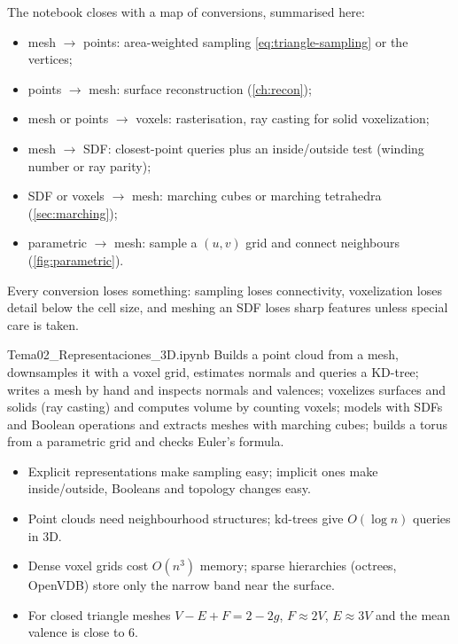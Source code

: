 The notebook closes with a map of conversions, summarised here:
\begin{itemize}
  \item mesh $\to$ points: area-weighted sampling \eqref{eq:triangle-sampling} or the vertices;
  \item points $\to$ mesh: surface reconstruction (\cref{ch:recon});
  \item mesh or points $\to$ voxels: rasterisation, ray casting for solid voxelization;
  \item mesh $\to$ SDF: closest-point queries plus an inside/outside test (winding number or ray
  parity);
  \item SDF or voxels $\to$ mesh: marching cubes or marching tetrahedra (\cref{sec:marching});
  \item parametric $\to$ mesh: sample a $(u,v)$ grid and connect neighbours (\cref{fig:parametric}).
\end{itemize}
Every conversion loses something: sampling loses connectivity, voxelization loses detail below the
cell size, and meshing an SDF loses sharp features unless special care is taken.

\begin{notebook}{Tema02\_Representaciones\_3D.ipynb}
Builds a point cloud from a mesh, downsamples it with a voxel grid, estimates normals and queries a
KD-tree; writes a mesh by hand and inspects normals and valences; voxelizes surfaces and solids
(ray casting) and computes volume by counting voxels; models with SDFs and Boolean operations and
extracts meshes with marching cubes; builds a torus from a parametric grid and checks Euler's
formula.
\end{notebook}

\begin{keypoints}
\begin{itemize}[leftmargin=*]
  \item Explicit representations make sampling easy; implicit ones make inside/outside, Booleans and
  topology changes easy.
  \item Point clouds need neighbourhood structures; kd-trees give $O(\log n)$ queries in 3D.
  \item Dense voxel grids cost $O(n^3)$ memory; sparse hierarchies (octrees, OpenVDB) store only the
  narrow band near the surface.
  \item For closed triangle meshes $V-E+F=2-2g$, $F\approx2V$, $E\approx3V$ and the mean valence is
  close to 6.
\end{itemize}
\end{keypoints}

